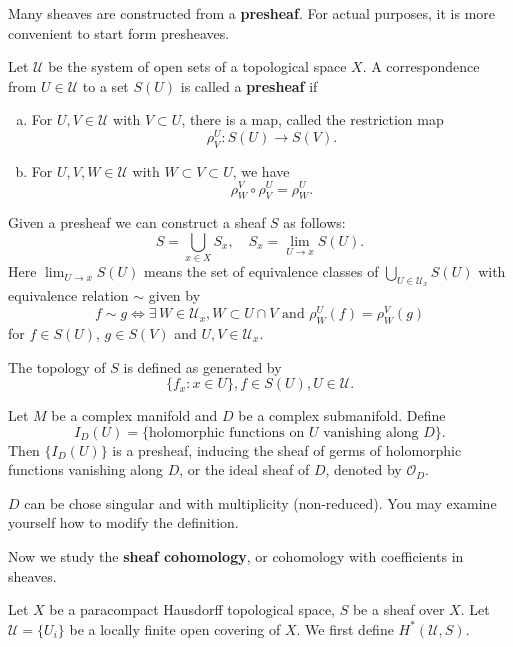 \documentclass[12pt]{article}
\begin{document}
Many sheaves are constructed from a \textbf{presheaf}. For actual purposes, it is
more convenient to start form presheaves.

\begin{definition}[Presheaf]
Let \(\mathcal{U}\) be the system of open sets of a topological space \(X\).
A correspondence from \(U\in \mathcal{U}\) to a set \(S(U)\) is called a
\textbf{presheaf} if 
\begin{enumerate}[(a)]
\item For \(U,V\in \mathcal{U}\) with \(V\subset U\), there is a map, called the
  restriction map \[
    \rho_V^U\colon S(U)\longrightarrow S(V)
  .\]
\item For \(U,V,W\in \mathcal{U}\) with \(W\subset V\subset U\), we have \[
  \rho_W^V\circ \rho_V^U=\rho_W^U
.\] 
\end{enumerate}
\end{definition}

Given a presheaf we can construct a sheaf \(S\) as follows: \[
  S=\bigcup_{x \in X}S_x,\quad S_x=\lim_{U\to x} S(U)
.\] Here \(\lim_{U\to x}S(U)\) means the set of equivalence classes of
\(\bigcup_{U\in \mathcal{U}_x}S(U)\) with equivalence relation \(\sim\) given by \[
  f\sim g\iff \exists\,W\in \mathcal{U}_x,W\subset U\cap V\text{ and }
  \rho_W^U(f)=\rho_W^V(g)
\] for \(f\in S(U)\), \(g\in S(V)\) and \(U,V\in \mathcal{U}_x\).

The topology of \(S\) is defined as generated by \[
  \{f_x:x\in U\},f\in S(U),U\in \mathcal{U}
.\] 

\begin{example}
  Let \(M\) be a complex manifold and \(D\) be a complex submanifold. Define \[
    I_D(U)=\{\text{holomorphic functions on }U\text{ vanishing along }D\}
  .\] Then \(\{I_D(U)\}\) is a presheaf, inducing the sheaf of germs of holomorphic
  functions vanishing along \(D\), or the ideal sheaf of \(D\), denoted by
  \(\mathcal{O}_D\).
\end{example}
\begin{remark}
  \(D\) can be chose singular and with multiplicity (non-reduced). You may examine
  yourself how to modify the definition.
\end{remark}

Now we study the \textbf{sheaf cohomology}, or cohomology with coefficients in
sheaves.

Let \(X\) be a paracompact Hausdorff topological space, \(S\) be a sheaf over \(X\).
Let \(\mathcal{U}=\{U_i\}\) be a locally finite open covering of \(X\). We first
define \(H^*(\mathcal{U},S)\).
\end{document}
